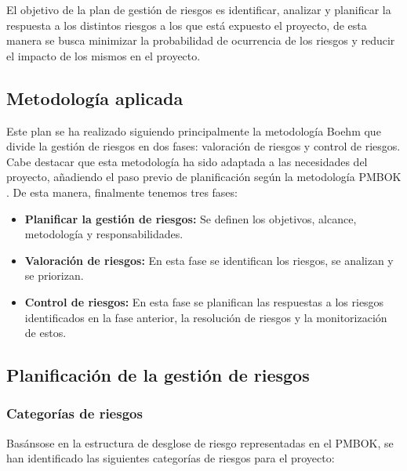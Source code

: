 El objetivo de la plan de gestión de riesgos es identificar, analizar y planificar la respuesta a los distintos riesgos a los que está expuesto el proyecto, de esta manera se busca minimizar la probabilidad de ocurrencia de los riesgos y reducir el impacto de los mismos en el proyecto.
\subsection*{Metodología aplicada}
Este plan se ha realizado siguiendo principalmente la metodología Boehm \cite{boehm1991} que divide la gestión de riesgos en dos fases: valoración de riesgos y control de riesgos. Cabe destacar que esta metodología ha sido adaptada a las necesidades del proyecto, añadiendo el paso previo de planificación según la metodología PMBOK \cite{pmbok2013}. De esta manera, finalmente tenemos tres fases:

\begin{itemize}
    \item \textbf{Planificar la gestión de riesgos:} Se definen los objetivos, alcance, metodología y responsabilidades.
    \item \textbf{Valoración de riesgos:} En esta fase se identifican los riesgos, se analizan y se priorizan.
    \item \textbf{Control de riesgos:} En esta fase se planifican las respuestas a los riesgos identificados en la fase anterior, la resolución de riesgos y la monitorización de estos.
\end{itemize}
\subsection*{Planificación de la gestión de riesgos}
\subsubsection*{Categorías de riesgos}
Basánsose en la estructura de desglose de riesgo representadas en el PMBOK, se han identificado las siguientes categorías de riesgos para el proyecto:

